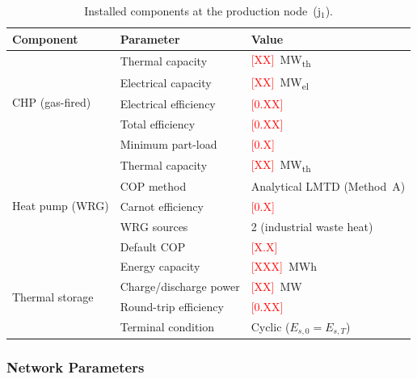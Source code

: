 \documentclass[review,3p]{elsarticle}
\newcommand{\placeholder}[1]{\textcolor{red}{[#1]}}
\begin{document}
\begin{table}[htbp]
\centering
\caption{Installed components at the production node~(j$_1$).}
\label{tab:components}
\begin{tabular}{@{}lll@{}}
\toprule
Component & Parameter & Value \\
\midrule
\multirow{5}{*}{CHP (gas-fired)}
  & Thermal capacity       & \placeholder{XX}~MW\textsubscript{th} \\
  & Electrical capacity    & \placeholder{XX}~MW\textsubscript{el} \\
  & Electrical efficiency  & \placeholder{0.XX} \\
  & Total efficiency       & \placeholder{0.XX} \\
  & Minimum part-load      & \placeholder{0.X} \\
\midrule
\multirow{5}{*}{Heat pump (WRG)}
  & Thermal capacity       & \placeholder{XX}~MW\textsubscript{th} \\
  & COP method             & Analytical LMTD (Method~A) \\
  & Carnot efficiency      & \placeholder{0.X} \\
  & WRG sources            & 2 (industrial waste heat) \\
  & Default COP            & \placeholder{X.X} \\
\midrule
\multirow{4}{*}{Thermal storage}
  & Energy capacity        & \placeholder{XXX}~MWh \\
  & Charge/discharge power & \placeholder{XX}~MW \\
  & Round-trip efficiency   & \placeholder{0.XX} \\
  & Terminal condition     & Cyclic ($E_{s,0} = E_{s,T}$) \\
\bottomrule
\end{tabular}
\end{table}

\subsubsection{Network Parameters}
\label{sec:case_network_params}
\end{document}
